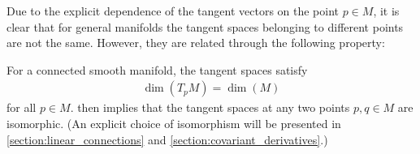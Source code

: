     Due to the explicit dependence of the tangent vectors on the point $p\in M$, it is clear that for general manifolds the tangent spaces belonging to different points are not the same. However, they are related through the following property:
    \begin{property}
        For a connected smooth manifold, the tangent spaces satisfy
        \begin{gather}
            \dim(T_pM)=\dim(M)
        \end{gather}
        for all $p\in M$.  then implies that the tangent spaces at any two points $p,q\in M$ are isomorphic. (An explicit choice of isomorphism will be presented in \cref{section:linear_connections} and \cref{section:covariant_derivatives}.)
    \end{property}

